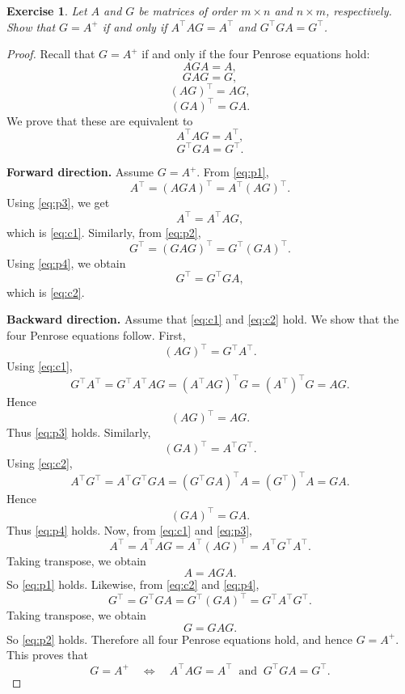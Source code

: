 \documentclass[11pt]{article}
\newtheorem{exercise}{Exercise}[section]
\theoremstyle{definition}
\begin{document}
\begin{exercise}
Let $A$ and $G$ be matrices of order $m\times n$ and $n\times m$, respectively. Show that
$G=A^{+}$ if and only if $A^\top A G=A^\top$ and $G^\top G A=G^\top$.
\end{exercise}

\begin{proof}
Recall that $G=A^{+}$ if and only if the four Penrose equations hold:
\begin{equation}\label{eq:p1}
AGA=A,
\end{equation}
\begin{equation}\label{eq:p2}
GAG=G,
\end{equation}
\begin{equation}\label{eq:p3}
(AG)^\top=AG,
\end{equation}
\begin{equation}\label{eq:p4}
(GA)^\top=GA.
\end{equation}
We prove that these are equivalent to
\begin{equation}\label{eq:c1}
A^\top A G=A^\top,
\end{equation}
\begin{equation}\label{eq:c2}
G^\top G A=G^\top.
\end{equation}

\medskip
\noindent
\textbf{Forward direction.}
Assume $G=A^+$. From \eqref{eq:p1},
\[
A^\top=(AGA)^\top=A^\top(AG)^\top.
\]
Using \eqref{eq:p3}, we get
\[
A^\top=A^\top AG,
\]
which is \eqref{eq:c1}.
Similarly, from \eqref{eq:p2},
\[
G^\top=(GAG)^\top=G^\top(GA)^\top.
\]
Using \eqref{eq:p4}, we obtain
\[
G^\top=G^\top GA,
\]
which is \eqref{eq:c2}.

\medskip
\noindent
\textbf{Backward direction.}
Assume that \eqref{eq:c1} and \eqref{eq:c2} hold. We show that the four Penrose equations follow.
First,
\[
(AG)^\top=G^\top A^\top.
\]
Using \eqref{eq:c1},
\[
G^\top A^\top = G^\top A^\top A G
              = (A^\top A G)^\top G
              = (A^\top)^\top G
              = AG.
\]
Hence
\[
(AG)^\top=AG.
\]
Thus \eqref{eq:p3} holds.
Similarly,
\[
(GA)^\top=A^\top G^\top.
\]
Using \eqref{eq:c2},
\[
A^\top G^\top = A^\top G^\top G A
              = (G^\top G A)^\top A
              = (G^\top)^\top A
              = GA.
\]
Hence
\[
(GA)^\top=GA.
\]
Thus \eqref{eq:p4} holds.
Now, from \eqref{eq:c1} and \eqref{eq:p3},
\[
A^\top=A^\top AG=A^\top(AG)^\top=A^\top G^\top A^\top.
\]
Taking transpose, we obtain
\[
A=AGA.
\]
So \eqref{eq:p1} holds.
Likewise, from \eqref{eq:c2} and \eqref{eq:p4},
\[
G^\top=G^\top GA=G^\top (GA)^\top=G^\top A^\top G^\top.
\]
Taking transpose, we obtain
\[
G=GAG.
\]
So \eqref{eq:p2} holds.
Therefore all four Penrose equations hold, and hence $G=A^+$.
This proves that
\[
G=A^+
\quad\Longleftrightarrow\quad
A^\top A G=A^\top
\ \text{ and }\
G^\top G A=G^\top.
\]
\end{proof}
\end{document}
